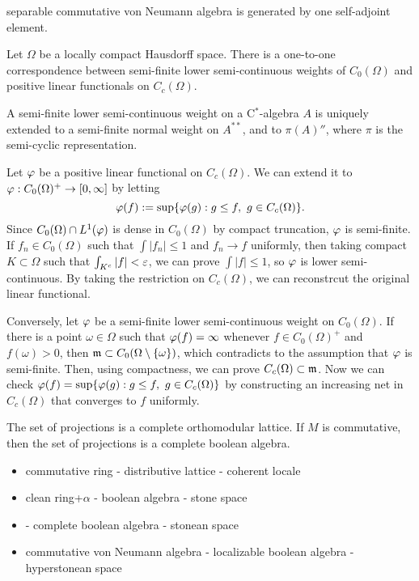 \documentclass{../../large}
\begin{document}
separable commutative von Neumann algebra is generated by one self-adjoint element.

\begin{prb}
Let $\Omega$ be a locally compact Hausdorff space.
There is a one-to-one correspondence between semi-finite lower semi-continuous weights of $C_0(\Omega)$ and positive linear functionals on $C_c(\Omega)$.

A semi-finite lower semi-continuous weight on a C$^*$-algebra $A$ is uniquely extended to a semi-finite normal weight on $A^{**}$, and to $\pi(A)''$, where $\pi$ is the semi-cyclic representation.
\end{prb}
\begin{pf}
Let $\varphi$ be a positive linear functional on $C_c(\Omega)$.
We can extend it to $\varphi:C_0(\Omega)^+\to[0,\infty]$ by letting
\[\varphi(f):=\sup\{\varphi(g):g\le f,\ g\in C_c(\Omega)\}.\]
Since $C_0(\Omega)\cap L^1(\varphi)$ is dense in $C_0(\Omega)$ by compact truncation, $\varphi$ is semi-finite.
If $f_n\in C_0(\Omega)$ such that $\int|f_n|\le1$ and $f_n\to f$ uniformly, then taking compact $K\subset\Omega$ such that $\int_{K^c}|f|<\varepsilon$, we can prove $\int|f|\le1$, so $\varphi$ is lower semi-continuous.
By taking the restriction on $C_c(\Omega)$, we can reconstrcut the original linear functional.

Conversely, let $\varphi$ be a semi-finite lower semi-continuous weight on $C_0(\Omega)$.
If there is a point $\omega\in\Omega$ such that $\varphi(f)=\infty$ whenever $f\in C_0(\Omega)^+$ and $f(\omega)>0$, then $\mathfrak{m}\subset C_0(\Omega\setminus\{\omega\})$, which contradicts to the assumption that $\varphi$ is semi-finite.
Then, using compactness, we can prove $C_c(\Omega)\subset\mathfrak{m}$.
Now we can check $\varphi(f)=\sup\{\varphi(g):g\le f,\ g\in C_c(\Omega)\}$ by constructing an increasing net in $C_c(\Omega)$ that converges to $f$ uniformly.
\end{pf}




\begin{prb}
The set of projections is a complete orthomodular lattice.
If $M$ is commutative, then the set of projections is a complete boolean algebra.
\end{prb}

\begin{itemize}
\item commutative ring - distributive lattice - coherent locale
\item clean ring+$\alpha$ - boolean algebra - stone space
\item - complete boolean algebra - stonean space
\item commutative von Neumann algebra - localizable boolean algebra - hyperstonean space
\end{itemize}
\end{document}
